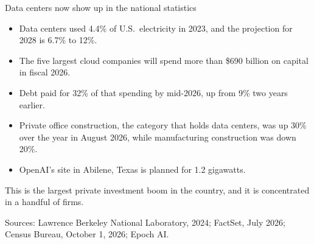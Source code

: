 \documentclass[aspectratio=169,11pt]{beamer}
\begin{document}
\begin{frame}{Data centers now show up in the national statistics}

\begin{itemize}\setlength\itemsep{0.3em}
    \item Data centers used 4.4\% of U.S.\ electricity in 2023, and the projection for 2028 is 6.7\% to 12\%.
    \item The five largest cloud companies will spend more than \$690 billion on capital in fiscal 2026.
    \item Debt paid for 32\% of that spending by mid-2026, up from 9\% two years earlier.
    \item Private office construction, the category that holds data centers, was up 30\% over the year in August 2026, while manufacturing construction was down 20\%.
    \item OpenAI's site in Abilene, Texas is planned for 1.2 gigawatts.
\end{itemize}

\vspace{0.2cm}

\alert{This is the largest private investment boom in the country, and it is concentrated in a handful of firms.}

\vspace{0.1cm}
{\scriptsize\color{warmgray}Sources: Lawrence Berkeley National Laboratory, 2024; FactSet, July 2026; Census Bureau, October 1, 2026; Epoch AI.}

\end{frame}
\end{document}
